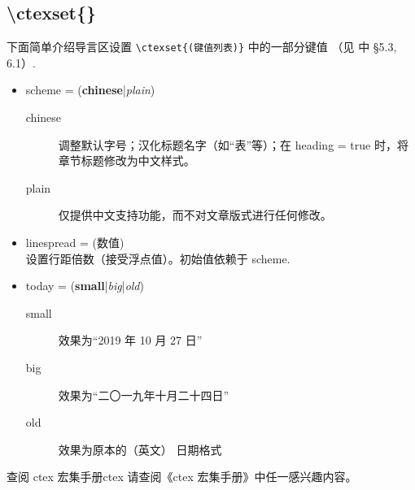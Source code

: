 \subsection{\textbackslash ctexset\{\}}
下面简单介绍导言区设置 \verb|\ctexset{(键值列表)}| 中的一部分键值 （见 \cite{ctex} 中 \S 5.3, 6.1）.
\begin{itemize}
\item scheme = (\textbf{chinese}|\emph{plain})
\begin{description}
  \item[chinese] 调整默认字号；汉化标题名字（如“表”等）；在 heading = true 时，将章节标题修改为中文样式。
  \item[plain] 仅提供中文支持功能，而不对文章版式进行任何修改。 
  \end{description}
\item linespread = (数值)\\
设置行距倍数（接受浮点值）。初始值依赖于 scheme.
\item today = (\textbf{small}|\emph{big}|\emph{old})
\begin{description}
  \item[small] 效果为“2019 年 10 月 27 日”
  \item[big] 效果为“二〇一九年十月二十四日”
  \item[old] 效果为原本的（英文） 日期格式 
\end{description}
\end{itemize}

\begin{Ex}{查阅 ctex 宏集手册}{ctex}
请查阅《ctex 宏集手册》中任一感兴趣内容。
\end{Ex}